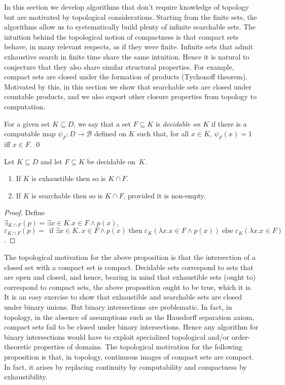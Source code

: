 \documentclass{LMCS}
\newcommand{\e}{\varepsilon}
\newcommand{\pBool}{\mathcal{B}}
\newcommand{\If}{\,\mathrel{\operatorname{if}}}
\newcommand{\Then}{\mathrel{\operatorname{then}}}
\newcommand{\Else}{\mathrel{\operatorname{else}}}
\newcommand{\True}{1}\newcommand{\False}{0}\newcommand{\domain}[1]{{\D_{#1}}}
\newcommand{\D}{D}
\begin{document}
In this section we develop algorithms that don't require knowledge of
topology but are motivated by topological considerations.  Starting
from the finite sets, the algorithms allow us to systematically build
plenty of infinite searchable sets.
The intuition behind the topological notion of compactness is that
compact sets behave, in many relevant respects, as if they were
finite.  Infinite sets that admit exhaustive search in finite time
share the same intuition. Hence it is natural to conjecture that they
also share similar structural properties. For example, compact sets
are closed under the formation of products (Tychonoff theorem).
Motivated by this, in this section we show that searchable sets are
closed under countable products, and we also export other closure
properties from topology to computation.

\begin{defi} \label{decidableonk} For a given set $K \subseteq
  D$, we say that a set $F \subseteq K$ is \emph{decidable on $K$} if
  there is a computable map $\psi_F \colon D \to \pBool$ defined on
  $K$ such that, for all $x \in K$, $\psi_F(x)=\True$ iff $x \in F$. \qed
\end{defi}
\pagebreak[3]
\begin{prop} \label{prop:intersec} Let $K \subseteq D$ and let $F \subseteq
  K$ be decidable on~$K$.
\begin{enumerate}
\item If $K$ is exhaustible then so is $K \cap F$. 
\item If $K$ is searchable then so is $K \cap F$, provided it is
  non-empty.
\end{enumerate}
\end{prop}
\begin{proof}
  Define \\
$\exists_{K \cap F}(p) = \exists x \in K. x \in F
  \wedge
  p(x)$, \\
$\e_{K \cap F}(p) = \If \exists x \in K.\,
  x \in F \wedge p(x) \Then \e_K(\lambda x. x \in F \wedge
  p(x)) \Else \e_K(\lambda x. x \in F)$.
\end{proof}
The topological motivation for the above proposition is that the
intersection of a closed set with a compact set is compact. Decidable
sets correspond to sets that are open and closed, and hence, bearing
in mind that exhaustible sets (ought to) correspond to compact sets,
the above proposition ought to be true, which it is.  It is an easy
exercise to show that exhaustible and searchable sets are closed under
binary unions.  But binary intersections are problematic.  In fact,
in topology, in the absence of assumptions such as the Hausdorff
separation axiom, compact sets fail to be closed under binary
intersections. Hence any algorithm for binary intersections would have
to exploit specialized topological and/or order-theoretic properties
of domains.  The topological motivation for the following proposition
is that, in topology, continuous images of compact sets are compact.
In fact, it arises by replacing continuity by computability and
compactness by exhaustibility.
\end{document}
